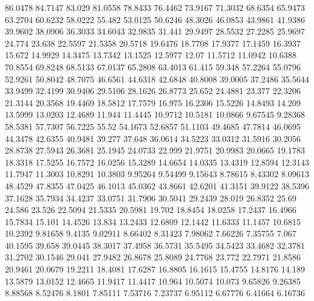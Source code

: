 86.0478      84.7147      83.029      81.0558      78.8433      76.4462      73.9167      71.3032      68.6354      65.9473      63.2704      60.6232      58.0222      55.482      53.0125      50.6246      48.3026      46.0853      43.9861      41.9386      39.9602      38.0906      36.3033      34.6043      32.9835      31.441      29.9497      28.5532      27.2285      25.9697      24.774      23.638      22.5597      21.5358      20.5718      19.6476      18.7708      17.9377      17.1459      16.3937      15.672      14.9929      14.3475      13.7342      13.1525      12.5977      12.07      11.5712      11.0942      10.6388      
70.8554      69.8248      68.5133      67.0137      65.2808      63.4013      61.415      59.348      57.2264      55.0796      52.9261      50.8042      48.7075      46.6561      44.6318      42.6848      40.8008      39.0005      37.2486      35.5644      33.9499      32.4199      30.9406      29.5106      28.1626      26.8773      25.652      24.4881      23.377      22.3206      21.3144      20.3568      19.4469      18.5812      17.7579      16.975      16.2306      15.5226      14.8493      14.209      13.5999      13.0203      12.4689      11.944      11.4445      10.9712      10.5181      10.0866      9.67545      9.28368      
58.5381      57.7307      56.7225      55.52      54.1673      52.6857      51.1103      49.4685      47.7814      46.0695      44.3478      42.6355      40.9481      39.277      37.648      36.0614      34.5223      33.0312      31.5916      30.2056      28.8738      27.5943      26.3681      25.1945      24.0733      22.999      21.9751      20.9983      20.0665      19.1783      18.3318      17.5255      16.7572      16.0256      15.3289      14.6654      14.0335      13.4319      12.8594      12.3143      11.7947      11.3003      10.8291      10.3803      9.95264      9.54499      9.15643      8.78615      8.43302      8.09613      
48.4529      47.8355      47.0425      46.1013      45.0362      43.8661      42.6201      41.3151      39.9122      38.5396      37.1628      35.7934      34.4237      33.0751      31.7906      30.5041      29.2439      28.019      26.8352      25.69      24.586      23.526      22.5094      21.5335      20.5981      19.702      18.8454      18.0258      17.2437      16.4966      15.7834      15.101      14.4526      13.834      13.2433      12.6809      12.1442      11.6333      11.1457      10.6815      10.2392      9.81658      9.4135      9.02911      8.66402      8.31423      7.98062      7.66226      7.35755      7.067      
40.1595      39.658      39.0445      38.3017      37.4958      36.5731      35.5495      34.5423      33.4682      32.3781      31.2702      30.1546      29.041      27.9482      26.8678      25.8089      24.7768      23.772      22.7971      21.8586      20.9461      20.0679      19.2211      18.4081      17.6287      16.8805      16.1615      15.4755      14.8176      14.189      13.5879      13.0152      12.4665      11.9417      11.4417      10.964      10.5074      10.073      9.65826      9.26385      8.88568      8.52476      8.1801      7.85111      7.53716      7.23737      6.95112      6.67776      6.41664      6.16736      
